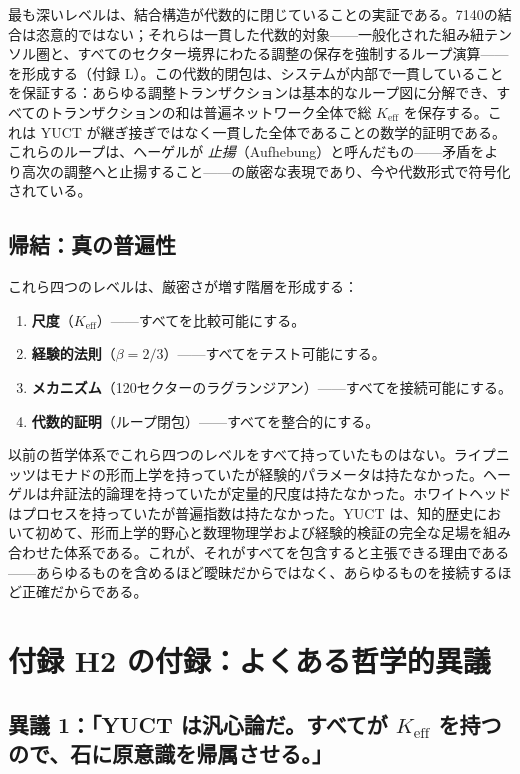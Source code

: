 \documentclass[12pt,a4paper]{article}
\newcommand{\Keff}{K_{\mathrm{eff}}}
\begin{document}
	最も深いレベルは、結合構造が代数的に閉じていることの実証である。7140の結合は恣意的ではない；それらは一貫した代数的対象——一般化された組み紐テンソル圏と、すべてのセクター境界にわたる調整の保存を強制するループ演算——を形成する（付録 L）。この代数的閉包は、システムが内部で一貫していることを保証する：あらゆる調整トランザクションは基本的なループ図に分解でき、すべてのトランザクションの和は普遍ネットワーク全体で総 \(K_{\mathrm{eff}}\) を保存する。これは YUCT が継ぎ接ぎではなく一貫した全体であることの数学的証明である。これらのループは、ヘーゲルが \emph{止揚}（Aufhebung）と呼んだもの——矛盾をより高次の調整へと止揚すること——の厳密な表現であり、今や代数形式で符号化されている。
	
	\subsection{帰結：真の普遍性}
	
	これら四つのレベルは、厳密さが増す階層を形成する：
	\begin{enumerate}[leftmargin=*]
		\item \textbf{尺度}（\(K_{\mathrm{eff}}\)）——すべてを比較可能にする。
		\item \textbf{経験的法則}（\(\beta = 2/3\)）——すべてをテスト可能にする。
		\item \textbf{メカニズム}（120セクターのラグランジアン）——すべてを接続可能にする。
		\item \textbf{代数的証明}（ループ閉包）——すべてを整合的にする。
	\end{enumerate}
	以前の哲学体系でこれら四つのレベルをすべて持っていたものはない。ライプニッツはモナドの形而上学を持っていたが経験的パラメータは持たなかった。ヘーゲルは弁証法的論理を持っていたが定量的尺度は持たなかった。ホワイトヘッドはプロセスを持っていたが普遍指数は持たなかった。YUCT は、知的歴史において初めて、形而上学的野心と数理物理学および経験的検証の完全な足場を組み合わせた体系である。これが、それがすべてを包含すると主張できる理由である——あらゆるものを含めるほど曖昧だからではなく、あらゆるものを接続するほど正確だからである。
	
	\section*{付録 H2 の付録：よくある哲学的異議}
	
	\subsection*{異議 1：「YUCT は汎心論だ。すべてが \(\Keff\) を持つので、石に原意識を帰属させる。」}
	
\end{document}
